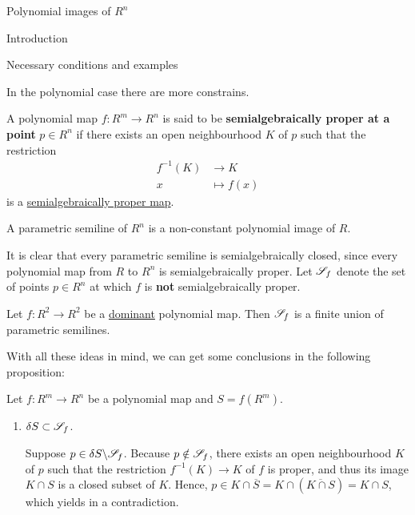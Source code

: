 \documentclass[11pt, a4paper, english, twoside, notitlepage]{report}
\begin{document}
\begin{chapter}{Polynomial images of $R^n$}
\begin{section}{Introduction}
\begin{subsection}{Necessary conditions and examples}
	
	In the polynomial case there are more constrains.
	
	\begin{definition}
		
		A polynomial map $f: R^m \longrightarrow R^n$ is said to be \textbf{semialgebraically proper at a point} $p \in R^n$ if there exists an open neighbourhood $K$ of $p$ such that the restriction 
		\begin{align*}
			f^{-1}(K) & \longrightarrow K\\
			x & \longmapsto f(x)
		\end{align*}
		is a \hyperref[properMap]{semialgebraically proper map}.
		
	\end{definition}
	
	\begin{definition}
		
		A parametric semiline  of $R^n$ is a non-constant polynomial image of $R$.
		
	\end{definition}
	
	It is clear that every parametric semiline is semialgebraically closed, since every polynomial map from $R$ to $R^n$ is semialgebraically proper. Let $\S_f$ denote the set of points $p \in R^n$ at which $f$ is \textbf{not} semialgebraically proper.
	
	\begin{theorem}[Jelonek]\label{jelonek}
		
		Let $f: R^2 \longrightarrow R^2$ be a \hyperref[dominant]{dominant} polynomial map. Then $\S_f$ is a finite union of parametric semilines.
		
	\end{theorem}
	
	With all these ideas in mind, we can get some conclusions in the following proposition:
	
	\begin{proposition}\label{propIntro}
			
	Let $f: R^m \longrightarrow R^n$ be a polynomial map and $S = f(R^m)$.
		\begin{enumerate}[(1)]
			\item $\delta S \subset \S_f$.
				\begin{Proof}
					Suppose $p \in \delta S \backslash \S_f$. Because $p \notin \S_f$, there exists an open neighbourhood $K$ of $p$ such that the restriction $f^{-1}(K) \rightarrow K$ of $f$ is proper, and thus its image $K \cap S$ is a closed subset of $K$. Hence, $p \in K\cap \overline{S} = K \cap (\overline{K\cap S}) = K \cap S$, which yields in a contradiction.
				\end{Proof}
			

\end{enumerate}
\end{proposition}
\end{subsection}
\end{section}
\end{chapter}
\end{document}
